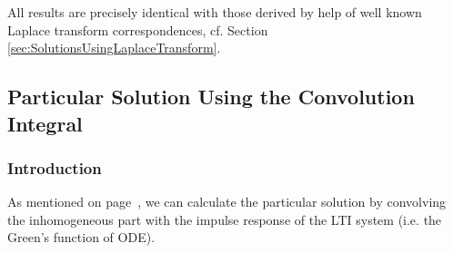 All results are precisely identical with those derived by help of well known Laplace transform correspondences,
cf. Section \ref{sec:SolutionsUsingLaplaceTransform}.
\clearpage
\subsection{Particular Solution Using the Convolution Integral}
\subsubsection{Introduction}
As mentioned on page~\pageref{pg:sig_sys_ex_03AddOn:convolution}, we can calculate
the particular solution by convolving the inhomogeneous part with the impulse
response of the LTI system (i.e. the Green's function of ODE).

